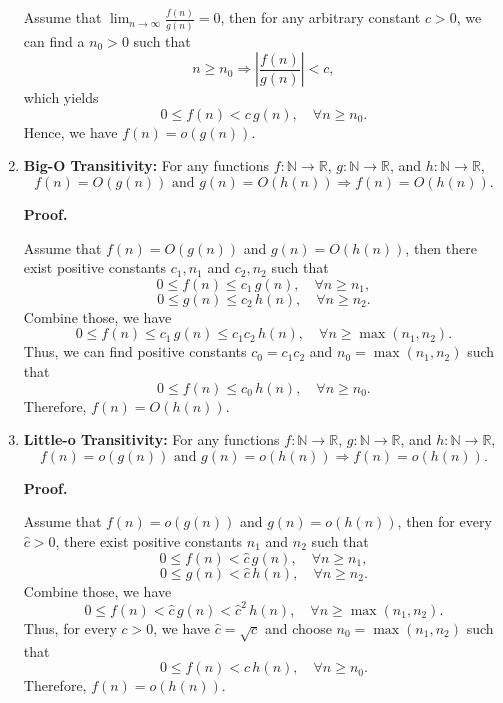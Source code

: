 \documentclass[12pt]{article}
\begin{document}
\begin{enumerate}
    \fbox{\(\Longleftarrow\)}

    Assume that \(\displaystyle\lim_{n \to \infty} \frac{f(n)}{g(n)} = 0\), then for any arbitrary constant \(c > 0\), we can find a \(n_0 > 0\) such that
    \[
        n \geq n_0 \Longrightarrow \left|\frac{f(n)}{g(n)}\right| < c,
    \]
    which yields
    \[
        0 \leq f(n) < c \, g(n), \quad \forall n \geq n_0.
    \]
    Hence, we have \(f(n) = o(g(n))\).

    \newpage

    \item \textbf{Big-O Transitivity:} For any functions \(f : \mathbb{N} \to \mathbb{R}\), \(g : \mathbb{N} \to \mathbb{R}\), and \(h : \mathbb{N} \to \mathbb{R}\),
    \[
        f(n) = O(g(n)) \text{ and } g(n) = O(h(n)) \Longrightarrow f(n) = O(h(n)).
    \]

    \textbf{Proof.}

    Assume that \(f(n) = O(g(n))\) and \(g(n) = O(h(n))\), then there exist positive constants \(c_1, n_1\) and \(c_2, n_2\) such that
    \[
        0 \leq f(n) \leq c_1 \, g(n), \quad \forall n \geq n_1,
    \]
    \[
        0 \leq g(n) \leq c_2 \, h(n), \quad \forall n \geq n_2.
    \]
    Combine those, we have
    \[
        0 \leq f(n) \leq c_1 \, g(n) \leq c_1 c_2 \, h(n), \quad \forall n \geq \max(n_1, n_2).
    \]
    Thus, we can find positive constants \(c_0 = c_1 c_2\) and \(n_0 = \max(n_1, n_2)\) such that
    \[
        0 \leq f(n) \leq c_0 \, h(n), \quad \forall n \geq n_0.
    \]
    Therefore, \(f(n) = O(h(n))\).

    \item \textbf{Little-o Transitivity:} For any functions \(f : \mathbb{N} \to \mathbb{R}\), \(g : \mathbb{N} \to \mathbb{R}\), and \(h : \mathbb{N} \to \mathbb{R}\),
    \[
        f(n) = o(g(n)) \text{ and } g(n) = o(h(n)) \Longrightarrow f(n) = o(h(n)).
    \]

    \textbf{Proof.}

    Assume that \(f(n) = o(g(n))\) and \(g(n) = o(h(n))\), then for every \(\hat{c} > 0\), there exist positive constants \(n_1\) and \(n_2\) such that
    \[
        0 \leq f(n) < \hat{c} \, g(n), \quad \forall n \geq n_1,
    \]
    \[
        0 \leq g(n) < \hat{c} \, h(n), \quad \forall n \geq n_2.
    \]
    Combine those, we have
    \[
        0 \leq f(n) < \hat{c} \, g(n) < \hat{c}^2 \, h(n), \quad \forall n \geq \max(n_1, n_2).
    \]
    Thus, for every \(c > 0\), we have \(\hat{c} = \sqrt{c}\) and choose \(n_0 = \max(n_1, n_2)\) such that
    \[
        0 \leq f(n) < c \, h(n), \quad \forall n \geq n_0.
    \]
    Therefore, \(f(n) = o(h(n))\).


\end{enumerate}
\end{document}
